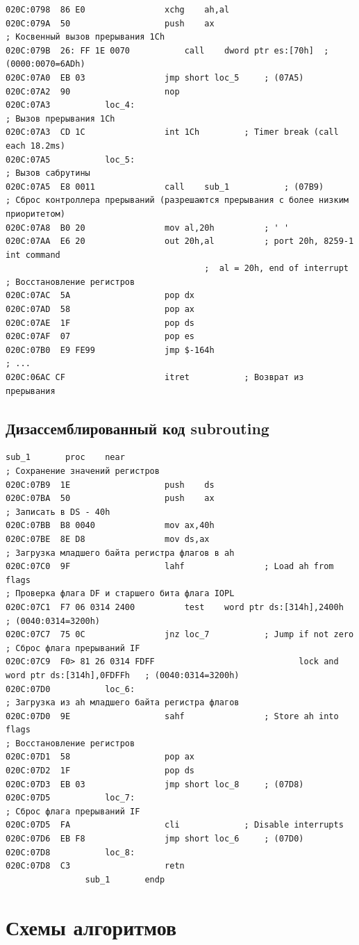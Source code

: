 \documentclass{article}
\begin{document}
\begin{lstlisting}[style={asm}]
020C:0798  86 E0				xchg	ah,al
020C:079A  50					push	ax
; Косвенный вызов прерывания 1Ch
020C:079B  26: FF 1E 0070			call	dword ptr es:[70h]	; (0000:0070=6ADh)
020C:07A0  EB 03				jmp	short loc_5		; (07A5)
020C:07A2  90					nop
020C:07A3			loc_4:
; Вызов прерывания 1Ch
020C:07A3  CD 1C				int	1Ch			; Timer break (call each 18.2ms)
020C:07A5			loc_5:
; Вызов сабрутины
020C:07A5  E8 0011				call	sub_1			; (07B9)
; Сброс контроллера прерываний (разрешаются прерывания с более низким приоритетом)
020C:07A8  B0 20				mov	al,20h			; ' '
020C:07AA  E6 20				out	20h,al			; port 20h, 8259-1 int command
										;  al = 20h, end of interrupt
; Восстановление регистров
020C:07AC  5A					pop	dx
020C:07AD  58					pop	ax
020C:07AE  1F					pop	ds
020C:07AF  07					pop	es
020C:07B0  E9 FE99				jmp	$-164h
; ...
020C:06AC CF					itret			; Возврат из прерывания
\end{lstlisting}

\subsection{Дизассемблированный код subrouting}
\begin{lstlisting}[style={asm}]
				sub_1		proc	near
; Сохранение значений регистров
020C:07B9  1E					push	ds
020C:07BA  50					push	ax
; Записать в DS - 40h 
020C:07BB  B8 0040				mov	ax,40h
020C:07BE  8E D8				mov	ds,ax
; Загрузка младшего байта регистра флагов в ah
020C:07C0  9F					lahf				; Load ah from flags
; Проверка флага DF и старшего бита флага IOPL
020C:07C1  F7 06 0314 2400			test	word ptr ds:[314h],2400h	; (0040:0314=3200h)
020C:07C7  75 0C				jnz	loc_7			; Jump if not zero
; Сброс флага прерываний IF
020C:07C9  F0> 81 26 0314 FDFF	                           lock	and	word ptr ds:[314h],0FDFFh	; (0040:0314=3200h)
020C:07D0			loc_6:
; Загрузка из ah младшего байта регистра флагов
020C:07D0  9E					sahf				; Store ah into flags
; Восстановление регистров
020C:07D1  58					pop	ax
020C:07D2  1F					pop	ds
020C:07D3  EB 03				jmp	short loc_8		; (07D8)
020C:07D5			loc_7:
; Сброс флага прерываний IF
020C:07D5  FA					cli				; Disable interrupts
020C:07D6  EB F8				jmp	short loc_6		; (07D0)
020C:07D8			loc_8:
020C:07D8  C3					retn
				sub_1		endp
\end{lstlisting}

\section{Схемы алгоритмов}
\end{document}

